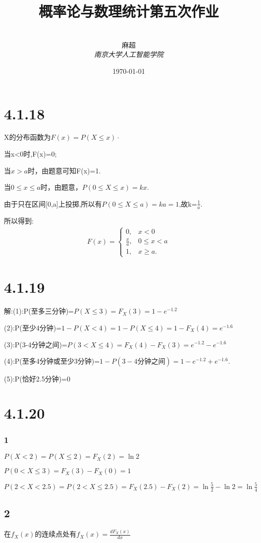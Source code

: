 \documentclass[12pt,a4paper,fontset=none]{ctexart}
\title{\textbf{概率论与数理统计第五次作业}}
\author{
\\
\Large{麻超 \quad 201300066}
\\[6pt]
{ \large \textit{南京大学人工智能学院}}\\[2pt]
}
\date{\today}
\begin{document}
\maketitle
\setcounter{page}{1}

\section*{4.1.18}
X的分布函数为$F(x)=P(X\leqslant x)\cdot$

当x<0时,F(x)=0;

当$x> a$时，由题意可知F(x)=1.

当$0\leqslant x \leqslant a$时，由题意，$P(0\leqslant X \leqslant x)=kx.$

由于只在区间[0,a]上投掷,所以有$P(0\leqslant X\leqslant a)=ka=1$,故k=$\frac{1}{a} $.

所以得到:
\begin{align*}
    F(x)=
    \begin{cases}
        0,           & \text{} x<0            \\
        \frac{x}{a}, & \text{} 0\leqslant x<a \\
        1,           & \text{} x\geqslant a .
    \end{cases}
\end{align*}
\section*{4.1.19}
解:(1):P(至多三分钟)=$P(X\leqslant 3)=F_X(3)=1-e^{-1.2}$

(2):P(至少4分钟)=$1-P(X<4)=1-P(X\leqslant 4)=1-F_X(4)=e^{-1.6}$

(3):P(3-4分钟之间)=$P(3<X\leqslant 4)=F_X(4)-F_X(3)=e^{-1.2}-e^{-1.6}$

(4):P(至多4分钟或至少3分钟)=$1-P(3-4分钟之间)=1-e^{-1.2}+e^{-1.6}$.

(5):P(恰好2.5分钟)=0
\section*{4.1.20}
\subsubsection*{1}
$P(X<2)=P(X\leqslant 2)=F_X(2)=\ln 2$

$P(0<X\leqslant 3)=F_X(3)-F_X(0)=1$

$P(2<X<2.5)=P(2<X\leqslant 2.5)=F_X(2.5)-F_X(2)=\ln \frac{5}{2}-\ln 2=\ln \frac{5}{4}  $
\subsection*{2}
在$f_X(x)$的连续点处有$f_X(x)=\frac{d F_X(x)}{d x}$
\end{document}
